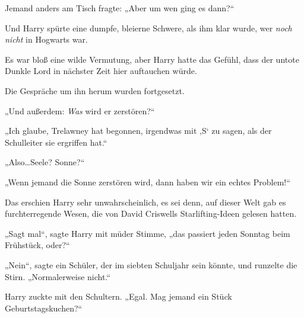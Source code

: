 Jemand anders am Tisch fragte: „Aber um wen ging es dann?“

Und Harry spürte eine dumpfe, bleierne Schwere, als ihm klar wurde, wer \emph{noch nicht} in Hogwarts war.

Es war bloß eine wilde Vermutung, aber Harry hatte das Gefühl, dass der untote Dunkle Lord in nächster Zeit hier auftauchen würde.

Die Gespräche um ihn herum wurden fortgesetzt.

„Und außerdem: \emph{Was} wird er zerstören?“

„Ich glaube, Trelawney hat begonnen, irgendwas mit ‚S‘ zu sagen, als der Schulleiter sie ergriffen hat.“

„Also…Seele? Sonne?“

„Wenn jemand die Sonne zerstören wird, dann haben wir ein echtes Problem!“

Das erschien Harry sehr unwahrscheinlich, es sei denn, auf dieser Welt gab es furchterregende Wesen, die von David Criswells Starlifting-Ideen gelesen hatten.%

„Sagt mal“, sagte Harry mit müder Stimme, „das passiert jeden Sonntag beim Frühstück, oder?“

„Nein“, sagte ein Schüler, der im siebten Schuljahr sein könnte, und runzelte die Stirn. „Normalerweise nicht.“

Harry zuckte mit den Schultern. „Egal. Mag jemand ein Stück Geburtstagskuchen?“

